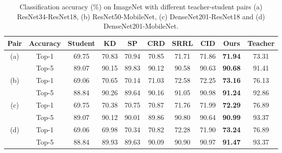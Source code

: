 \documentclass{article}
\begin{document}
\begin{table}
    \caption{Classification accuracy ($\%$) on ImageNet with different teacher-student pairs (a) ResNet34-ResNet18, (b) ResNet50-MobileNet, (c) DenseNet201-ResNet18 and (d) DenseNet201-MobileNet.}
    \label{tableImageNet}
    \centering
    \begin{tabular}{c|c|ccccccc|c}
    \hline
    Pair &Accuracy &Student &KD &SP &CRD &SRRL &CID &Ours &Teacher\\
    \hline 
    \multirow{2}{*}{(a)}  &Top-1 &69.75 &70.83 &70.94 &70.85 &71.71 &71.86 &\textbf{71.94}  &73.31\\
    &Top-5 &89.07 &90.15 &89.83 &90.12 &90.58 &90.63 &\textbf{90.68}    &91.41\\
    \hline
    \multirow{2}{*}{(b)}  &Top-1 &69.06 &70.65 &70.14 &71.03 &72.58 &72.25 &\textbf{73.16} &76.13\\
    &Top-5 &88.84 &90.26 &89.64 &90.16 &91.05 &90.98 &\textbf{91.24}  &92.86\\
    \hline
    \multirow{2}{*}{(c)}  &Top-1 &69.75 &70.38 &70.75 &70.87 &71.76  &71.99 &\textbf{72.29} &76.89\\
    &Top-5 &89.07 &90.12 &90.01 &89.86 &90.80  &90.64 &\textbf{90.99}  &93.37\\
    \hline
    \multirow{2}{*}{(d)}  &Top-1 &69.06 &69.98 &70.34 &70.82 &72.28 &71.90 &\textbf{73.24}  &76.89\\
    &Top-5 &88.84 &89.93 &89.63 &90.09 &90.90 &90.97 &\textbf{91.47}  &93.37\\
    \hline
    \end{tabular}
\end{table}
\end{document}
